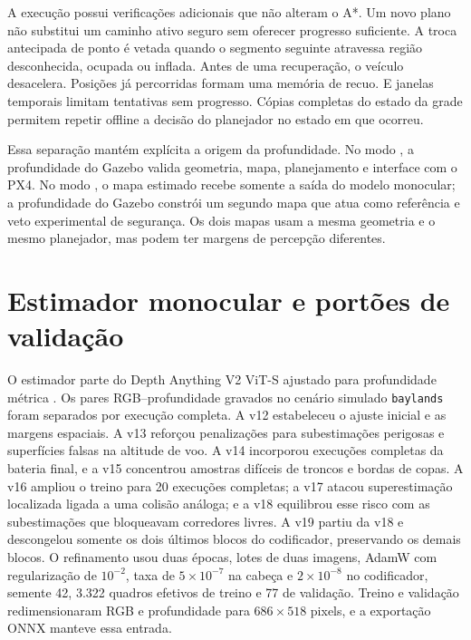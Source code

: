 A execução possui verificações adicionais que não alteram o A*. Um novo plano não substitui um caminho ativo seguro sem oferecer progresso suficiente. A troca antecipada de ponto é vetada quando o segmento seguinte atravessa região desconhecida, ocupada ou inflada. Antes de uma recuperação, o veículo desacelera. Posições já percorridas formam uma memória de recuo. E janelas temporais limitam tentativas sem progresso. Cópias completas do estado da grade permitem repetir offline a decisão do planejador no estado em que ocorreu.

Essa separação mantém explícita a origem da profundidade. No modo , a profundidade do Gazebo valida geometria, mapa, planejamento e interface com o PX4. No modo , o mapa estimado recebe somente a saída do modelo monocular; a profundidade do Gazebo constrói um segundo mapa que atua como referência e veto experimental de segurança. Os dois mapas usam a mesma geometria e o mesmo planejador, mas podem ter margens de percepção diferentes.

\section{Estimador monocular e portões de validação}

O estimador parte do Depth Anything V2 ViT-S ajustado para profundidade métrica \cite{DepthAnythingV2}. Os pares RGB--profundidade gravados no cenário simulado \texttt{baylands} foram separados por execução completa. A v12 estabeleceu o ajuste inicial e as margens espaciais. A v13 reforçou penalizações para subestimações perigosas e superfícies falsas na altitude de voo. A v14 incorporou execuções completas da bateria final, e a v15 concentrou amostras difíceis de troncos e bordas de copas. A v16 ampliou o treino para 20 execuções completas; a v17 atacou superestimação localizada ligada a uma colisão análoga; e a v18 equilibrou esse risco com as subestimações que bloqueavam corredores livres. A v19 partiu da v18 e descongelou somente os dois últimos blocos do codificador, preservando os demais blocos. O refinamento usou duas épocas, lotes de duas imagens, AdamW com regularização de $10^{-2}$, taxa de $5\times10^{-7}$ na cabeça e $2\times10^{-8}$ no codificador, semente 42, 3.322 quadros efetivos de treino e 77 de validação. Treino e validação redimensionaram RGB e profundidade para $686\times518$ pixels, e a exportação ONNX manteve essa entrada.

